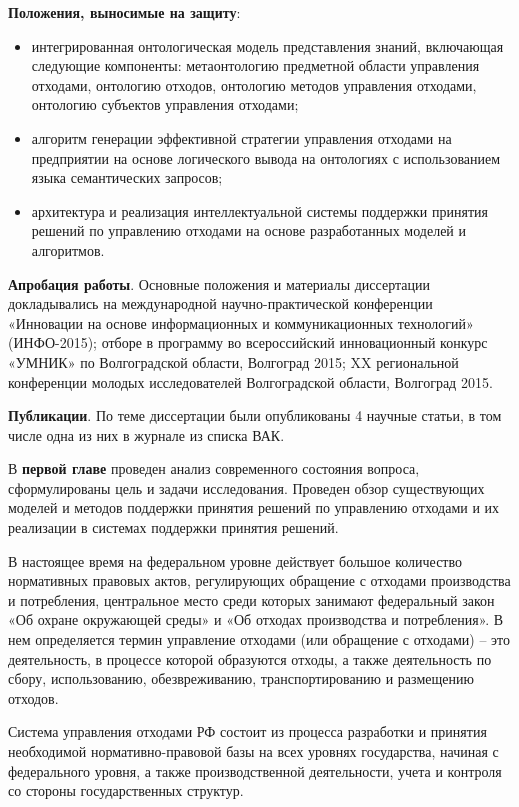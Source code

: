 \documentclass[a4paper]{G2-105}
\begin{document}
\textbf{Положения, выносимые на защиту}:
\begin{itemize}
\item интегрированная онтологическая модель представления знаний, включающая следующие компоненты: метаонтологию предметной области управления отходами, онтологию отходов, онтологию методов управления отходами, онтологию субъектов управления отходами;
\item алгоритм генерации эффективной стратегии управления отходами на предприятии на основе
логического вывода на онтологиях с использованием языка семантических запросов;
\item архитектура и реализация интеллектуальной системы поддержки принятия решений по управлению отходами на основе разработанных моделей и алгоритмов.
\end{itemize}

\textbf{Апробация работы}. Основные положения и материалы диссертации докладывались
на международной научно-практической конференции «Инновации на основе информационных и коммуникационных технологий» (ИНФО-2015); отборе в программу во всероссийский инновационный конкурс «УМНИК» по Волгоградской области, Волгоград 2015; XX региональной конференции молодых исследователей Волгоградской области, Волгоград 2015.

\textbf{Публикации}. По теме диссертации были опубликованы 4 научные статьи, в том числе одна из них в журнале из списка ВАК.


В \textbf{первой главе} проведен анализ современного состояния вопроса, сформулированы цель и задачи исследования. Проведен обзор существующих моделей и методов поддержки принятия решений по управлению отходами и их реализации в системах поддержки принятия решений.

В настоящее время на федеральном уровне действует большое количество нормативных правовых актов, регулирующих обращение с отходами производства и потребления, центральное место среди которых занимают федеральный закон «Об охране окружающей среды» и «Об отходах производства и потребления». В нем определяется термин управление отходами  (или обращение с отходами) -- это деятельность, в процессе которой образуются отходы, а также деятельность по сбору, использованию, обезвреживанию, транспортированию и размещению отходов.

Система управления отходами РФ состоит из процесса разработки и принятия необходимой нормативно-правовой базы на всех уровнях государства, начиная с федерального уровня, а также производственной деятельности, учета и контроля со стороны государственных структур.
\end{document}
